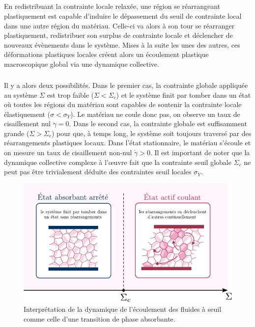 \subparagraph{}En redistribuant la contrainte locale relaxée, une région se réarrangeant plastiquement est capable d'induire le dépassement du seuil de contrainte local dans une autre région du matériau. Celle-ci va alors à son tour se réarranger plastiquement, redistribuer son surplus de contrainte locale et déclencher de nouveaux évènements dans le système. Mises à la suite les unes des autres, ces déformations plastiques locales créent alors un écoulement plastique macroscopique global via une dynamique collective.

\subparagraph{}Il y a alors deux possibilités. Dans le premier cas, la contrainte globale appliquée au système $\Sigma$ est trop faible ($\Sigma<\Sigma_c$) et le système finit par tomber dans un état où toutes les régions du matériau sont capables de soutenir la contrainte locale élastiquement ($\sigma < \sigma_Y$). Le matériau ne coule donc pas, on observe un taux de cisaillement nul $\dot{\gamma} = 0$. Dans le second cas, la contrainte globale est suffisamment grande ($\Sigma>\Sigma_c$) pour que, à temps long, le système soit toujours traversé par des réarrangements plastiques locaux. Dans l'état stationnaire, le matériau s'écoule et on mesure un taux de cisaillement non-nul $\dot{\gamma}>0$. Il est important de noter que la dynamique collective complexe à l’œuvre fait que la contrainte seuil globale $\Sigma_c$ ne peut pas être trivialement déduite des contraintes seuil locales $\sigma_Y$.

\begin{figure}[h]
	\centering
	\includegraphics[width=\textwidth]{Chapitre1/Figures/InterpretationCDP/YieldingAPT.pdf}
	\caption{Interprétation de la dynamique de l'écoulement des fluides à seuil comme celle d'une transition de phase absorbante.}
	\label{fig:YieldingCDP}
\end{figure}

